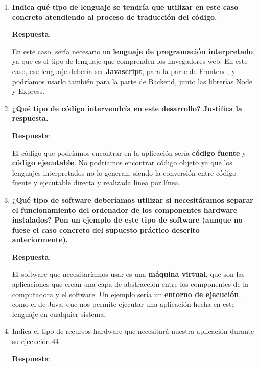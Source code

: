 \begin{enumerate}
    \item \textbf{Indica qué tipo de lenguaje se tendría que utilizar en este caso concreto atendiendo al proceso de traducción del código.}

    \textbf{Respuesta}:

     En este caso, sería necesario un \textbf{lenguaje de programación interpretado}, ya que es el tipo de lenguaje que comprenden los navegadores web. En este caso, ese lenguaje debería ser \textbf{Javascript}, para la parte de Frontend, y podríamos usarlo también para la parte de Backend, junto las librerías Node y Express.

    \item \textbf{¿Qué tipo de código intervendría en este desarrollo? Justifica la respuesta.}

    \textbf{Respuesta}:

    El código que podríamos encontrar en la aplicación sería \textbf{código fuente} y \textbf{código ejecutable}. No podríamos encontrar código objeto ya que los lenguajes interpretados no lo generan, siendo la conversión entre código fuente y ejecutable directa y realizada línea por línea.

    \item \textbf{¿Qué tipo de software deberíamos utilizar si necesitáramos separar el funcionamiento del ordenador de los componentes hardware instalados? Pon un ejemplo de este tipo de software (aunque no fuese el caso concreto del supuesto práctico descrito anteriormente).}

    \textbf{Respuesta}:

    El software que necesitaríamos usar es una \textbf{máquina virtual}, que son las aplicaciones que crean una capa de abstracción entre los componentes de la computadora y el software. Un ejemplo sería un \textbf{entorno de ejecución}, como el de Java, que nos permite ejecutar una aplicación hecha en este lenguaje en cualquier sistema.

    \item Indica el tipo de recursos hardware que necesitará nuestra aplicación durante su ejecución.44

    \textbf{Respuesta}:


\end{enumerate}
